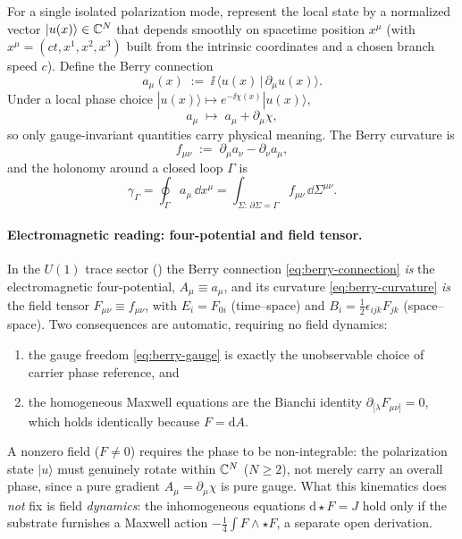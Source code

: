 For a single isolated polarization mode, represent the local state by a normalized vector
$|u(x)\rangle\in\mathbb{C}^{N}$ that depends smoothly on spacetime position $x^\mu$
(with $x^\mu=(ct,x^1,x^2,x^3)$ built from the intrinsic coordinates and a chosen branch speed $c$).
Define the Berry connection
\begin{equation}
  a_\mu(x) \;:=\; \ii\,\langle u(x)\,|\,\partial_\mu u(x)\rangle.
  \label{eq:berry-connection}
\end{equation}
Under a local phase choice $|u(x)\rangle\mapsto e^{-\ii\chi(x)}|u(x)\rangle$,
\begin{equation}
  a_\mu \;\mapsto\; a_\mu + \partial_\mu \chi,
  \label{eq:berry-gauge}
\end{equation}
so only gauge-invariant quantities carry physical meaning.
The Berry curvature is
\begin{equation}
  f_{\mu\nu} \;:=\; \partial_\mu a_\nu - \partial_\nu a_\mu,
  \label{eq:berry-curvature}
\end{equation}
and the holonomy around a closed loop $\Gamma$ is
\begin{equation}
  \gamma_\Gamma
  = \oint_\Gamma a_\mu\,\dd x^\mu
  = \int_{\Sigma:\,\partial\Sigma=\Gamma} f_{\mu\nu}\,\dd\Sigma^{\mu\nu}.
  \label{eq:berry-holonomy}
\end{equation}

\paragraph{Electromagnetic reading: four-potential and field tensor.}
In the $U(1)$ trace sector () the Berry connection
\eqref{eq:berry-connection} \emph{is} the electromagnetic four-potential, $A_\mu\equiv a_\mu$,
and its curvature \eqref{eq:berry-curvature} \emph{is} the field tensor $F_{\mu\nu}\equiv f_{\mu\nu}$,
with $E_i=F_{0i}$ (time--space) and $B_i=\tfrac12\epsilon_{ijk}F_{jk}$ (space--space).
Two consequences are automatic, requiring no field dynamics:
\begin{enumerate}
  \item the gauge freedom \eqref{eq:berry-gauge} is exactly the unobservable choice of carrier phase
  reference, and
  \item the homogeneous Maxwell equations are the Bianchi identity $\partial_{[\lambda}F_{\mu\nu]}=0$,
  which holds identically because $F=\mathrm{d}A$.
\end{enumerate}
A nonzero field ($F\neq 0$) requires the phase to be non-integrable: the polarization state
$|u\rangle$ must genuinely rotate within $\mathbb{C}^{N}$ ($N\ge 2$), not merely carry an overall phase,
since a pure gradient $A_\mu=\partial_\mu\chi$ is pure gauge.
What this kinematics does \emph{not} fix is field \emph{dynamics}: the inhomogeneous equations
$\mathrm{d}{\star}F=J$ hold only if the substrate furnishes a Maxwell action
$-\tfrac14\int F\wedge{\star}F$, a separate open derivation.

